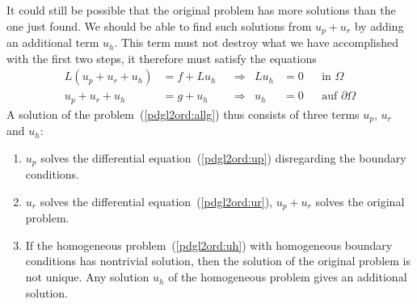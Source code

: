 It could still be possible that the original problem has more solutions
than the one just found.
We should be able to find such solutions from $u_p+u_r$ by adding
an additional term $u_h$.
This term must not destroy what we have accomplished with the first
two steps,
it therefore must satisfy the equations
\begin{equation}
\begin{aligned}
L(u_p+u_r+u_h)&=f+Lu_h&&\Rightarrow&Lu_h&=0&&\text{in $\Omega$}\\
  u_p+u_r+u_h &=g +u_h&&\Rightarrow& u_h&=0&&\text{auf $\partial\Omega$}
\end{aligned}
\label{pdgl2ord:uh}
\end{equation}
A solution of the problem~(\ref{pdgl2ord:allg}) thus consists of three
terms $u_p$, $u_r$ and $u_h$:
\begin{enumerate}
\item
$u_p$ solves the differential equation~(\ref{pdgl2ord:up}) disregarding
the boundary conditions.
\item
$u_r$ solves the differential equation~(\ref{pdgl2ord:ur}),
$u_p+u_r$ solves the original problem.
\item
If the homogeneous problem~(\ref{pdgl2ord:uh}) with homogeneous
boundary conditions has nontrivial solution, then the solution
of the original problem is not unique.
Any solution $u_h$ of the homogeneous problem gives an additional
solution.
\end{enumerate}


